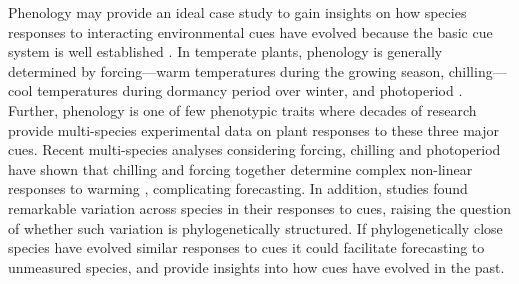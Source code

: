 \documentclass{article}\usepackage[]{graphicx}\usepackage[]{color}
\begin{document}

Phenology may provide an ideal case study to gain insights on how species responses to interacting environmental cues have evolved because the basic cue system is well established \citep{chuinearees}. In temperate plants, phenology is generally determined by forcing---warm temperatures during the growing season, chilling---cool temperatures during dormancy period over winter, and photoperiod \citep{chuinearees}. Further, phenology is one of few phenotypic traits where decades of research provide multi-species experimental data on plant responses to these three major cues. Recent multi-species analyses considering forcing, chilling and photoperiod have shown that chilling and forcing together determine complex non-linear responses to warming \citep{flynn2018,ettinger2020}, complicating forecasting. In addition, studies found remarkable variation across species in their responses to cues, raising the question of whether such variation is phylogenetically structured. If phylogenetically close species have evolved similar responses to cues it could facilitate forecasting to unmeasured species, and provide insights into how cues have evolved in the past. \\
\end{document}
